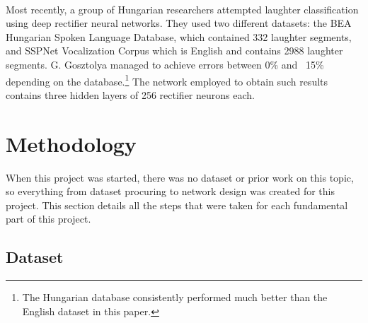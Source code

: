 \documentclass[a4paper,11pt,notitlepage]{article}
\begin{document}
\\
Most recently, a group of Hungarian researchers attempted laughter classification using deep rectifier neural networks\cite{gosztolya2016laughter}. They used two different datasets: the BEA Hungarian Spoken Language Database, which contained 332 laughter segments, and SSPNet Vocalization Corpus which is English and contains 2988 laughter segments. G. Gosztolya managed to achieve errors between 0\% and ~15\% depending on the database.\footnote{The Hungarian database consistently performed much better than the English dataset in this paper.} The network employed to obtain such results contains three hidden layers of 256 rectifier neurons each.

\newpage

\section{Methodology}


When this project was started, there was no dataset or prior work on this topic, so everything from dataset procuring to network design was created for this project. This section details all the steps that were taken for each fundamental part of this project.

\subsection{Dataset}

\end{document}

